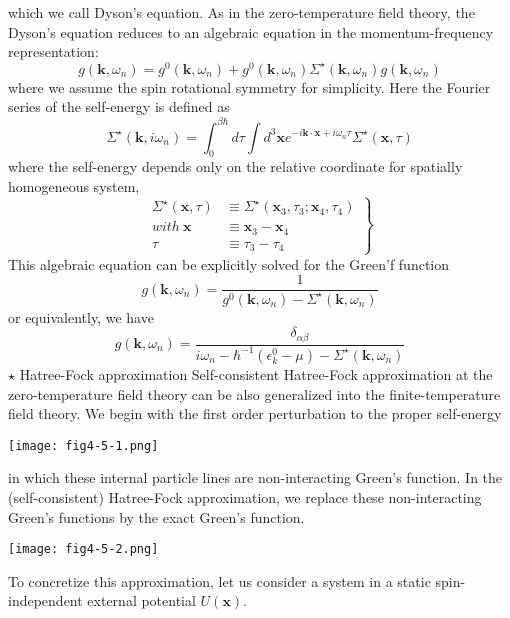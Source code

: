 which we call Dyson's equation.
As in the zero-temperature field theory, the Dyson's equation reduces to an algebraic equation in the momentum-frequency representation:
\begin{equation}
g(\mathbf{k},\omega_n)=g^0(\mathbf{k},\omega_n)+g^0(\mathbf{k},\omega_n)\Sigma^\star(\mathbf{k},\omega_n)g(\mathbf{k},\omega_n)
\end{equation}
where we assume the spin rotational symmetry for simplicity.
Here the Fourier series of the self-energy is defined as
\begin{equation}
\Sigma^\star(\mathbf{k},i\omega_n)=\int_0^{\beta\hbar} d\tau \int d^3\mathbf{x} e^{-i\mathbf{k}\cdot\mathbf{x}+i\omega_n\tau}\Sigma^\star(\mathbf{x},\tau)
\end{equation}
where the self-energy depends only on the relative coordinate for spatially homogeneous system,
\[
\left.
\begin{aligned}
\Sigma^\star(\mathbf{x},\tau)&\equiv\Sigma^\star(\mathbf{x}_3,\tau_3;\mathbf{x}_4,\tau_4)\\
with\ \mathbf{x}&\equiv\mathbf{x}_3-\mathbf{x}_4\\
\tau&\equiv\tau_3-\tau_4
\end{aligned}
\right\}\tag{$4.5.4^\prime$}
\]
This algebraic equation can be explicitly solved for the Green'f function
\begin{equation}
g(\mathbf{k},\omega_n)=\frac{1}{g^0(\mathbf{k},\omega_n)-\Sigma^\star(\mathbf{k},\omega_n)}
\end{equation}
or equivalently, we have
\[
g(\mathbf{k},\omega_n)=\frac{\delta_{\alpha\beta}}{i\omega_n-\hbar^{-1}(\epsilon_k^0-\mu)-\Sigma^\star(\mathbf{k},\omega_n)}\tag{$4.5.5^\prime$}
\]
$\star$ Hatree-Fock approximation
Self-consistent Hatree-Fock approximation at the zero-temperature field theory can be also generalized into the finite-temperature field theory.
We begin with the first order perturbation to the proper self-energy
\begin{center}
\texttt{[image: fig4-5-1.png]}
\end{center}
in which these internal particle lines are non-interacting Green's function.
In the (self-consistent) Hatree-Fock approximation, we replace these non-interacting Green's functions by the exact Green's function.
\begin{center}
\texttt{[image: fig4-5-2.png]}
\end{center}
To concretize this approximation, let us consider a system in a static spin-independent external potential $U(\mathbf{x})$.
